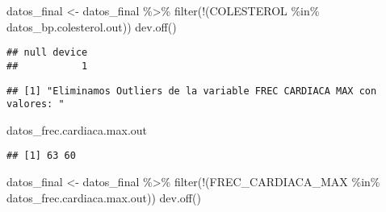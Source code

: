 \documentclass[
]{article}
\newenvironment{Shaded}{\begin{snugshade}}{\end{snugshade}}
\newcommand{\FunctionTok}[1]{\textcolor[rgb]{0.94,0.94,0.56}{#1}}
\newcommand{\NormalTok}[1]{\textcolor[rgb]{0.80,0.80,0.80}{#1}}
\newcommand{\OtherTok}[1]{\textcolor[rgb]{0.94,0.94,0.56}{#1}}
\newcommand{\SpecialCharTok}[1]{\textcolor[rgb]{0.86,0.64,0.64}{#1}}
\newcommand{\StringTok}[1]{\textcolor[rgb]{0.80,0.58,0.58}{#1}}
\begin{document}
\begin{Shaded}
\begin{Highlighting}[]
\NormalTok{datos\_final }\OtherTok{\textless{}{-}}\NormalTok{ datos\_final }\SpecialCharTok{\%\textgreater{}\%} \FunctionTok{filter}\NormalTok{(}\SpecialCharTok{!}\NormalTok{(COLESTEROL }\SpecialCharTok{\%in\%}\NormalTok{ datos\_bp.colesterol.out))}
\FunctionTok{dev.off}\NormalTok{()}
\end{Highlighting}
\end{Shaded}

\begin{verbatim}
## null device 
##           1
\end{verbatim}

\begin{Shaded}
\end{Shaded}

\begin{verbatim}
## [1] "Eliminamos Outliers de la variable FREC CARDIACA MAX con valores: "
\end{verbatim}

\begin{Shaded}
\begin{Highlighting}[]
\NormalTok{datos\_frec.cardiaca.max.out}
\end{Highlighting}
\end{Shaded}

\begin{verbatim}
## [1] 63 60
\end{verbatim}

\begin{Shaded}
\begin{Highlighting}[]
\NormalTok{datos\_final }\OtherTok{\textless{}{-}}\NormalTok{ datos\_final }\SpecialCharTok{\%\textgreater{}\%} \FunctionTok{filter}\NormalTok{(}\SpecialCharTok{!}\NormalTok{(FREC\_CARDIACA\_MAX }\SpecialCharTok{\%in\%}\NormalTok{ datos\_frec.cardiaca.max.out))}
\FunctionTok{dev.off}\NormalTok{()}
\end{Highlighting}
\end{Shaded}
\end{document}
